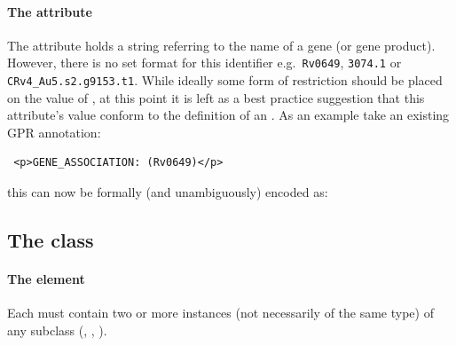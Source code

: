 
\paragraph{The  attribute}
The  attribute holds a string referring to the name of a gene (or gene product). However, 
there is no set format for this identifier e.g.~\verb+Rv0649+, \verb+3074.1+ or \verb+CRv4_Au5.s2.g9153.t1+. While ideally some form of restriction should be placed on the value of , at this point it is left as a best practice suggestion that this attribute's value conform to the definition of an . As an example take an existing GPR annotation:
\begin{verbatim}
 <p>GENE_ASSOCIATION: (Rv0649)</p>
\end{verbatim}
%
this can now be formally (and unambiguously) encoded as:
%

\pagebreak
\subsection{The \FBC {} class}
\label{and-class}


\paragraph{The  element}
Each \GeneAnd must contain two or more instances (not necessarily of the same type) of any \Association subclass (\GeneAnd, \GeneOr, \Gene).

